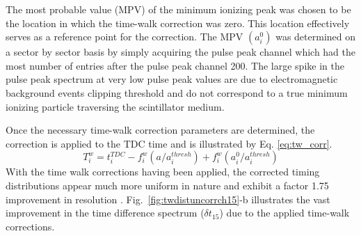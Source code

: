 The most probable value (MPV) of the minimum ionizing peak was chosen to be the location in which the time-walk correction was zero.  This location effectively serves as a reference point for the correction.  
The MPV $(a^{0}_{i})$ was determined on a sector by sector basis by simply acquiring the pulse peak channel which had the most number of entries after the pulse peak channel 200.  The large spike in the pulse peak spectrum at very low pulse peak values are due to electromagnetic background events clipping threshold and do not correspond to a true minimum ionizing particle traversing the scintillator medium.

Once the necessary time-walk correction parameters are determined, the correction is applied to the TDC time and is illustrated by Eq. \ref{eq:tw_corr}.
	\begin{equation} \label{eq:tw_corr}
		T^{w}_{i} = t^{TDC}_{i} - f^{w}_{i}(a/a^{thresh}_{i}) + f^{w}_{i}(a^{0}_{i}/a^{thresh}_{i})
	\end{equation}
With the time walk corrections having been applied, the corrected timing distributions appear much more uniform in nature and exhibit a factor 1.75 improvement in resolution \cite{pooser16}.  Fig.~\ref{fig:twdistuncorrch15}-b illustrates the vast improvement in the time difference spectrum ($\delta t_{15}$) due to the applied time-walk corrections.

